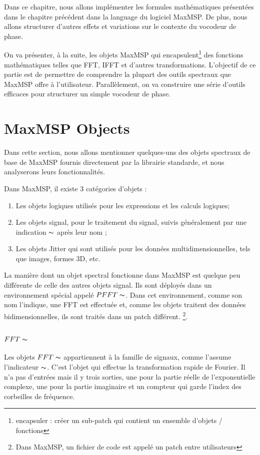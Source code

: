 
\label{ch:Design}

Dans ce chapitre, nous allons implémenter les formules mathématiques présentées dans le chapitre précédent dans la language du logiciel MaxMSP. De plus, nous allons structurer d'autres effets et variations sur le contexte du vocodeur de phase.

On va présenter, à la suite,  les objets MaxMSP qui encapsulent\footnote{encapsuler : créer un sub-patch qui contient un ensemble d'objets / fonctions } des fonctions mathématiques telles que FFT, IFFT et d’autres transformations. L’objectif de ce partie est de permettre de comprendre la plupart des outils spectraux que MaxMSP offre à l’utilisateur. Parallèlement, on va construire une série d’outils efficaces pour structurer un simple vocodeur de phase.

\section{MaxMSP Objects}

Dans cette section, nous allons mentionner quelques-uns des objets spectraux de base de MaxMSP fournis directement par la librairie standarde, et nous analyserons leurs fonctionnalités.

Dans MaxMSP, il existe 3 catégories d’objets :
 
\begin{enumerate}
    \item
    Les objets logiques utilisés pour les expressions et les calculs logiques; 
    \item
    Les objets signal, pour le traitement du signal, suivis généralement par une indication $ \thicksim $ après leur nom ; 
    \item
    Les objets Jitter qui sont utilisés pour les données multidimensionnelles, tels que images, formes 3D, etc.
\end{enumerate}


La manière dont un objet spectral fonctionne dans MaxMSP est quelque peu différente de celle des autres objets signal. Ils sont déployés dans un environnement spécial appelé $ PFFT \thicksim $. Dans cet environnement, comme son nom l'indique, une FFT est effectuée et, comme les objets traitent des données bidimensionnelles, ils sont traités dans un patch différent. \footnote{Dans MaxMSP, un fichier de code est appelé un patch entre utilisateurs}.

\subsubsection{$FFT\thicksim$}
    Les objets $ FFT \thicksim $ appartiennent à la famille de signaux, comme l'assume l'indicateur $ \thicksim $. C'est l'objet qui effectue la transformation rapide de Fourier. Il n'a pas d'entrées mais il y trois sorties, une pour la partie réelle de l'exponentielle complexe, une pour la partie imaginaire et un compteur qui garde l’index des corbeilles de fréquence.


